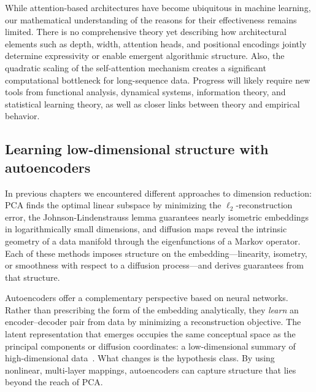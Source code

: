 \medskip
While attention-based architectures have become ubiquitous in machine learning, our mathematical understanding of the reasons for their effectiveness remains limited.
There is no comprehensive theory yet describing how architectural elements such as depth, width, attention heads, and positional encodings jointly determine expressivity or enable emergent algorithmic structure.
Also, the quadratic scaling of the self-attention mechanism creates a significant computational bottleneck for long-sequence data.
Progress will likely require new tools from functional analysis, dynamical systems, information theory, and statistical learning theory, as well as closer links between theory and empirical behavior.




\subsection{Learning low-dimensional structure with autoencoders}



In previous chapters we encountered different approaches 
to dimension reduction: PCA finds 
the optimal linear subspace by minimizing the $\ell_2$-reconstruction error, the  Johnson-Lindenstrauss lemma guarantees nearly isometric embeddings in logarithmically  small dimensions, and diffusion maps reveal the intrinsic geometry of a data manifold  through the eigenfunctions of a Markov operator. Each of these methods imposes  structure on the embedding---linearity, isometry, or smoothness with respect to a 
diffusion process---and derives guarantees from that structure.

Autoencoders offer a complementary perspective based on neural networks. Rather than prescribing the form of the embedding analytically, they  \emph{learn} an encoder--decoder pair from data by minimizing a reconstruction  objective. The latent representation that emerges occupies the same conceptual space as the principal components or diffusion coordinates: a 
low-dimensional summary of high-dimensional data~\cite{hinton2006reducing,bengio2013representation}. What changes is the hypothesis class. By using nonlinear, multi-layer mappings, autoencoders can capture structure 
that lies beyond the reach of PCA.


